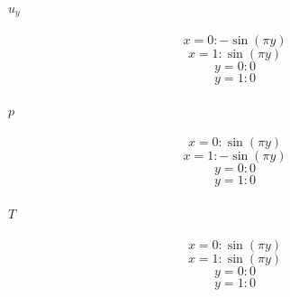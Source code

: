 \paragraph*{$u_y$}
\[x = 0: - \sin{\left(\pi y \right)}\]
\[x = 1: \sin{\left(\pi y \right)}\]
\[y = 0: 0\]
\[y = 1: 0\]
\paragraph*{$p$}
\[x = 0: \sin{\left(\pi y \right)}\]
\[x = 1: - \sin{\left(\pi y \right)}\]
\[y = 0: 0\]
\[y = 1: 0\]
\paragraph*{$T$}
\[x = 0: \sin{\left(\pi y \right)}\]
\[x = 1: \sin{\left(\pi y \right)}\]
\[y = 0: 0\]
\[y = 1: 0\]